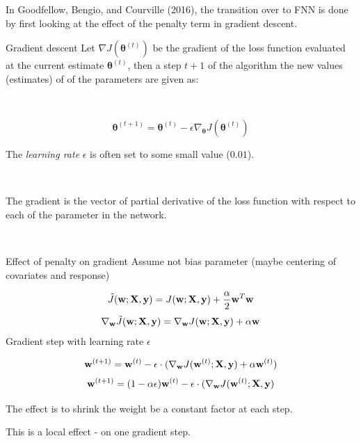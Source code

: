 \documentclass[
  ignorenonframetext,
]{beamer}
\begin{document}
\begin{frame}
In Goodfellow, Bengio, and Courville (2016), the transition over to FNN
is done by first looking at the effect of the penalty term in gradient
descent.

\begin{block}{Gradient descent}
\protect\hypertarget{gradient-descent}{}
Let \(\nabla J({\boldsymbol \theta}^{(t)})\) be the gradient of the loss
function evaluated at the current estimate
\({\boldsymbol \theta}^{(t)}\), then a step \(t+1\) of the algorithm the
new values (estimates) of of the parameters are given as:

\(~\)

\[{\boldsymbol \theta}^{(t+1)}={\boldsymbol \theta}^{(t)} - \epsilon \nabla_{\boldsymbol \theta} J({\boldsymbol \theta}^{(t)})\]

The \emph{learning rate} \(\epsilon\) is often set to some small value
(\(0.01\)).

\(~\)

The gradient is the vector of partial derivative of the loss function
with respect to each of the parameter in the network.

\(~\)
\end{block}
\end{frame}

\begin{frame}
\begin{block}{Effect of penalty on gradient}
\protect\hypertarget{effect-of-penalty-on-gradient}{}
Assume not bias parameter (maybe centering of covariates and response)

\[\tilde{J}({\bf w}; {\bf X}, {\bf y})=J({\bf w}; {\bf X}, {\bf y})+\frac{\alpha}{2}{\bf w}^T {\bf w}\]
\[\nabla_{\bf w} \tilde{J}({\bf w}; {\bf X}, {\bf y})=\nabla_{\bf w} J({\bf w}; {\bf X}, {\bf y})+\alpha{\bf w}\]
Gradient step with learning rate \(\epsilon\)

\[{\bf w}^{(t+1)}={\bf w}^{(t)}-\epsilon \cdot (\nabla_{\bf w} J({\bf w}^{(t)}; {\bf X}, {\bf y})+\alpha{\bf w}^{(t)})\]
\[{\bf w}^{(t+1)}=(1-\alpha \epsilon){\bf w}^{(t)}-\epsilon \cdot (\nabla_{\bf w} J({\bf w}^{(t)}; {\bf X}, {\bf y})\]

The effect is to shrink the weight be a constant factor at each step.

This is a local effect - on one gradient step.
\end{block}
\end{frame}
\end{document}
